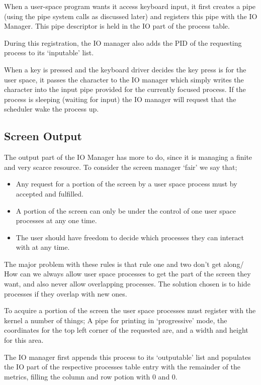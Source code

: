 \documentclass[a4paper]{report}
\begin{document}
When a user-space program wants it access keyboard input, it first creates a pipe (using the pipe system calls as discussed later) and registers this pipe with the IO Manager. This pipe descriptor is held in the IO part of the process table.

During this registration, the IO manager also adds the PID of the requesting process to its `inputable' list.

When a key is pressed and the keyboard driver decides the key press is for the user space, it passes the character to the IO manager which simply writes the character into the input pipe provided for the currently focused process. If the process is sleeping (waiting for input) the IO manager will request that the scheduler wake the process up.

\subsection{Screen Output}

The output part of the IO Manager has more to do, since it is managing a finite and very scarce resource. To consider the screen manager `fair' we say that; 
\begin{itemize}
\item Any request for a portion of the screen by a user space process must by accepted and fulfilled.
\item A portion of the screen can only be under the control of one user space processes at any one time.
\item The user should have freedom to decide which processes they can interact with at any time.
\end{itemize}

The major problem with these rules is that rule one and two don't get along/ How can we always allow user space processes to get the part of the screen they want, and also never allow overlapping processes. The solution chosen is to hide processes if they overlap with new ones.

To acquire a portion of the screen the user space processes must register with the kernel a number of things; A pipe for printing in `progressive' mode, the coordinates for the top left corner of the requested are, and a width and height for this area.

The IO manager first appends this process to its `outputable' list and populates the IO part of the respective processes table entry with the remainder of the metrics, filling the column and row potion with 0 and 0.
\end{document}
